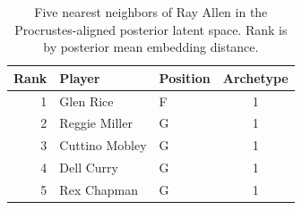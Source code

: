 \begin{table}[htbp]
  \centering\small
  \begin{tabular}{rllc}
    \toprule
    Rank & Player & Position & Archetype \\
    \midrule
    1 & Glen Rice & F & 1 \\
    2 & Reggie Miller & G & 1 \\
    3 & Cuttino Mobley & G & 1 \\
    4 & Dell Curry & G & 1 \\
    5 & Rex Chapman & G & 1 \\
    \bottomrule
  \end{tabular}
  \caption{Five nearest neighbors of Ray Allen in the Procrustes-aligned posterior latent space. Rank is by posterior mean embedding distance.}
  \label{tab:Ray_Allen_neighbors}
\end{table}

